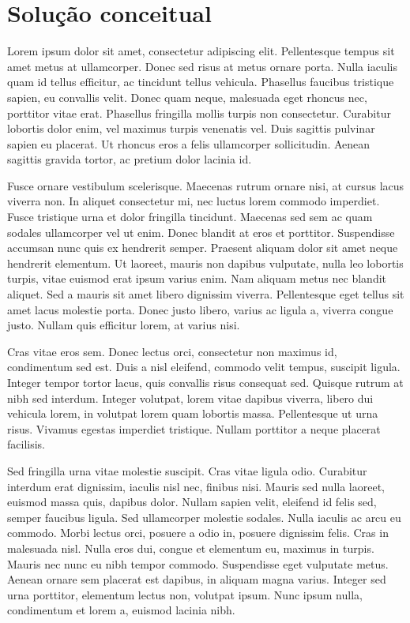 \section{Solução conceitual}

 Lorem ipsum dolor sit amet, consectetur adipiscing elit. Pellentesque tempus sit amet metus at ullamcorper. Donec sed risus at metus ornare porta. Nulla iaculis quam id tellus efficitur, ac tincidunt tellus vehicula. Phasellus faucibus tristique sapien, eu convallis velit. Donec quam neque, malesuada eget rhoncus nec, porttitor vitae erat. Phasellus fringilla mollis turpis non consectetur. Curabitur lobortis dolor enim, vel maximus turpis venenatis vel. Duis sagittis pulvinar sapien eu placerat. Ut rhoncus eros a felis ullamcorper sollicitudin. Aenean sagittis gravida tortor, ac pretium dolor lacinia id.

Fusce ornare vestibulum scelerisque. Maecenas rutrum ornare nisi, at cursus lacus viverra non. In aliquet consectetur mi, nec luctus lorem commodo imperdiet. Fusce tristique urna et dolor fringilla tincidunt. Maecenas sed sem ac quam sodales ullamcorper vel ut enim. Donec blandit at eros et porttitor. Suspendisse accumsan nunc quis ex hendrerit semper. Praesent aliquam dolor sit amet neque hendrerit elementum. Ut laoreet, mauris non dapibus vulputate, nulla leo lobortis turpis, vitae euismod erat ipsum varius enim. Nam aliquam metus nec blandit aliquet. Sed a mauris sit amet libero dignissim viverra. Pellentesque eget tellus sit amet lacus molestie porta. Donec justo libero, varius ac ligula a, viverra congue justo. Nullam quis efficitur lorem, at varius nisi.

Cras vitae eros sem. Donec lectus orci, consectetur non maximus id, condimentum sed est. Duis a nisl eleifend, commodo velit tempus, suscipit ligula. Integer tempor tortor lacus, quis convallis risus consequat sed. Quisque rutrum at nibh sed interdum. Integer volutpat, lorem vitae dapibus viverra, libero dui vehicula lorem, in volutpat lorem quam lobortis massa. Pellentesque ut urna risus. Vivamus egestas imperdiet tristique. Nullam porttitor a neque placerat facilisis.

Sed fringilla urna vitae molestie suscipit. Cras vitae ligula odio. Curabitur interdum erat dignissim, iaculis nisl nec, finibus nisi. Mauris sed nulla laoreet, euismod massa quis, dapibus dolor. Nullam sapien velit, eleifend id felis sed, semper faucibus ligula. Sed ullamcorper molestie sodales. Nulla iaculis ac arcu eu commodo. Morbi lectus orci, posuere a odio in, posuere dignissim felis. Cras in malesuada nisl. Nulla eros dui, congue et elementum eu, maximus in turpis. Mauris nec nunc eu nibh tempor commodo. Suspendisse eget vulputate metus. Aenean ornare sem placerat est dapibus, in aliquam magna varius. Integer sed urna porttitor, elementum lectus non, volutpat ipsum. Nunc ipsum nulla, condimentum et lorem a, euismod lacinia nibh. 